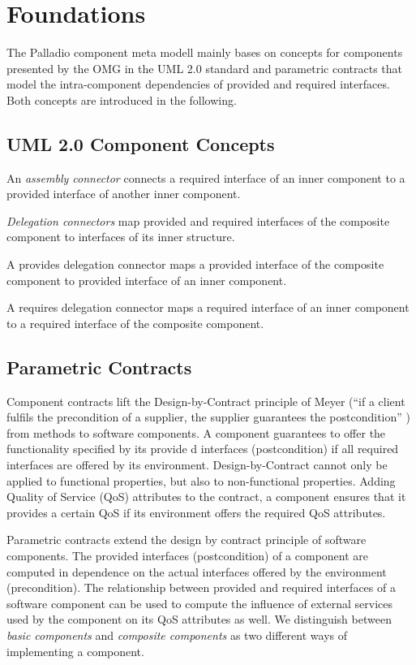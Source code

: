 \section{Foundations} %
\label{sec:foundations}

The Palladio component meta modell mainly bases on concepts for
components presented by the OMG in the UML 2.0 standard and parametric contracts
that model the intra-component dependencies of provided and required interfaces.
Both concepts are introduced in the following. 

\subsection{UML 2.0 Component Concepts}

An \emph{assembly connector} connects a required interface of an inner component
to a provided interface
of another inner component. 

\emph{Delegation connectors} map provided and required
interfaces of the composite component to interfaces of its inner
structure. 

A provides delegation connector maps
a provided interface of the composite component to provided interface of an
inner component. 

A requires delegation connector maps a required interface of an
inner component to a required interface of the composite component.


\subsection{Parametric Contracts}

Component contracts lift the Design-by-Contract principle of Meyer (``if a
client fulfils the precondition of a supplier, the supplier guarantees the
postcondition'' \cite{meyer1992a}) from methods to software components. A
component guarantees to offer the functionality specified by its provide
d interfaces (postcondition) if all required interfaces are offered by its
environment. Design-by-Contract cannot only be applied to
functional properties, but also to non-functional properties. Adding Quality of
Service (QoS) attributes to the contract, a component ensures that it
provides a certain QoS if its environment offers the required QoS attributes. 

Parametric contracts \cite{reussner2002c} extend the design by contract
principle of software components. The provided interfaces (postcondition) of a
component are computed in dependence on the actual interfaces offered by the
environment (precondition). The relationship between provided and required
interfaces of a software component can be used to compute the influence of
external services used by the component on its QoS attributes as well. We
distinguish between \emph{basic components} and \emph{composite components} as
two different ways of implementing a component.

